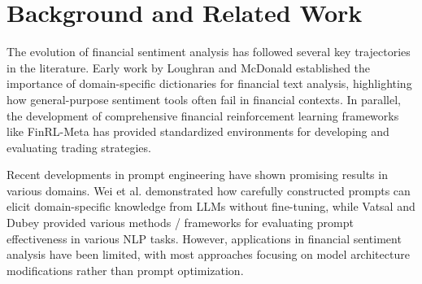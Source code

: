 \section{Background and Related Work}
The evolution of financial sentiment analysis has followed several key trajectories in the literature. Early work by Loughran and McDonald \cite{Loughran11} established the importance of domain-specific dictionaries for financial text analysis, highlighting how general-purpose sentiment tools often fail in financial contexts. In parallel, the development of comprehensive financial reinforcement learning frameworks like FinRL-Meta \cite{Liu20} has provided standardized environments for developing and evaluating trading strategies.

Recent developments in prompt engineering have shown promising results in various domains. Wei et al. \cite{Wei22} demonstrated how carefully constructed prompts can elicit domain-specific knowledge from LLMs without fine-tuning, while Vatsal and Dubey \cite{Vatsal23} provided various methods / frameworks for evaluating prompt effectiveness in various NLP tasks. However, applications in financial sentiment analysis have been limited, with most approaches focusing on model architecture modifications rather than prompt optimization.